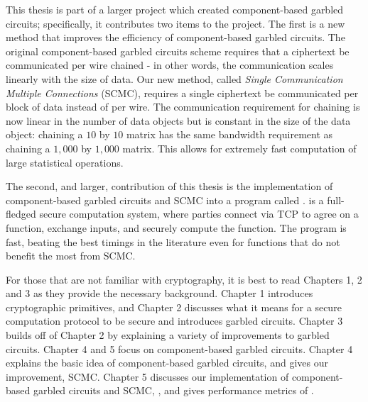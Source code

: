 This thesis is part of a larger project which created component-based garbled circuits; specifically, it contributes two items to the project.
The first is a new method that improves the efficiency of component-based garbled circuits. 
The original component-based garbled circuits scheme requires that a ciphertext be communicated per wire chained - in other words, the communication scales linearly with the size of data.
Our new method, called \textit{Single Communication Multiple Connections} (SCMC), requires a single ciphertext be communicated per block of data instead of per wire. 
The communication requirement for chaining is now linear in the number of data objects but is constant in the size of the data object: chaining a $10$ by $10$ matrix has the same bandwidth requirement as chaining a $1,000$ by $1,000$ matrix. 
This allows for extremely fast computation of large statistical operations. 

The second, and larger, contribution of this thesis is the implementation of component-based garbled circuits and SCMC into a program called \CompGC. 
\CompGC is a full-fledged secure computation system, where parties connect via TCP to agree on a function, exchange inputs, and securely compute the function.
The program is fast, beating the best timings in the literature even for functions that do not benefit the most from SCMC.

For those that are not familiar with cryptography, it is best to read Chapters 1, 2 and 3 as they provide the necessary background.
Chapter 1 introduces cryptographic primitives, and Chapter 2 discusses what it means for a secure computation protocol to be secure and introduces garbled circuits.
Chapter 3 builds off of Chapter 2 by explaining a variety of improvements to garbled circuits.
Chapter 4 and 5 focus on component-based garbled circuits.
Chapter 4 explains the basic idea of component-based garbled circuits, and gives our improvement, SCMC.
Chapter 5 discusses our implementation of component-based garbled circuits and SCMC, \CompGC, and gives performance metrics of \CompGC.







